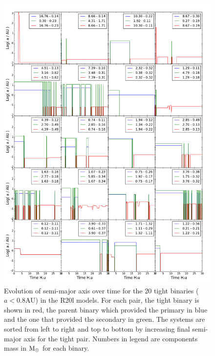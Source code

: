 \begin{figure}
\begin{center}
\includegraphics[width=\textwidth]{Figures/6_tights_origins}
\caption[Evolution of semi-major axis over time for 20 tight binaries]{Evolution of semi-major axis over time for the 20 tight binaries ($a < 0.8$AU) in the R20l models. For each pair, the tight binary is shown in red, the parent binary which provided the primary in blue and the one that provided the secondary in green. The systems are sorted from left to right and top to bottom by increasing final semi-major axis for the tight pair. Numbers in legend are components mass in ${\textrm{M}_\odot}$ for each binary.}
\label{Fig:6_origins}
\end{center}
\end{figure}


